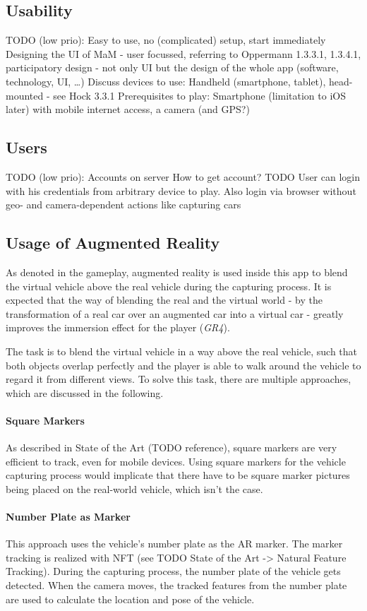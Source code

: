\subsection{Usability}
TODO (low prio):
Easy to use, no (complicated) setup, start immediately
Designing the UI of MaM - user focussed, referring to Oppermann 1.3.3.1, 1.3.4.1, participatory design - not only UI but the design of the whole app (software, technology, UI, …)
Discuss devices to use: Handheld (smartphone, tablet), head-mounted - see Hock 3.3.1
Prerequisites to play: Smartphone (limitation to iOS later) with mobile internet access, a camera (and GPS?)

\subsection{Users}
TODO (low prio):
Accounts on server
How to get account? TODO
User can login with his credentials from arbitrary device to play.
Also login via browser without geo- and camera-dependent actions like capturing cars

\subsection{Usage of Augmented Reality}
As denoted in the gameplay, augmented reality is used inside this app to blend the virtual vehicle above the real vehicle during the capturing process. It is expected that the way of blending the real and the virtual world - by the transformation of a real car over an augmented car into a virtual car - greatly improves the immersion effect for the player (\emph{GR4}).

The task is to blend the virtual vehicle in a way above the real vehicle, such that both objects overlap perfectly and the player is able to walk around the vehicle to regard it from different views. To solve this task, there are multiple approaches, which are discussed in the following.

\paragraph{Square Markers}
As described in State of the Art (TODO reference), square markers are very efficient to track, even for mobile devices. Using square markers for the vehicle capturing process would implicate that there have to be square marker pictures being placed on the real-world vehicle, which isn’t the case.

\paragraph{Number Plate as Marker}
This approach uses the vehicle’s number plate as the AR marker. The marker tracking is realized with NFT (see TODO State of the Art -> Natural Feature Tracking). During the capturing process, the number plate of the vehicle gets detected. When the camera moves, the tracked features from the number plate are used to calculate the location and pose of the vehicle.

